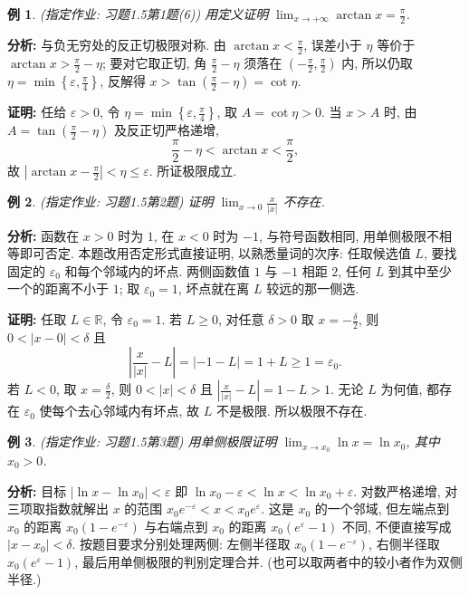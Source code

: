 \documentclass[UTF8,openany]{ctexbook}
\theoremstyle{chinesetextbook}
\newtheorem{example}{例}[section]
\newenvironment{cnproof}{\par\indent\textbf{证明:} \ignorespaces}{\par}
\begin{document}
\begin{example}
\textnormal{(指定作业: 习题1.5第1题(6))} 用定义证明 $\displaystyle \lim_{x\to+\infty}\arctan x=\frac\pi2$.
\end{example}
\par\indent\textbf{分析:} 与负无穷处的反正切极限对称. 由 $\displaystyle\arctan x<\frac\pi2$, 误差小于 $\eta$ 等价于 $\displaystyle\arctan x>\frac\pi2-\eta$; 要对它取正切, 角 $\displaystyle\frac\pi2-\eta$ 须落在 $\displaystyle\left(-\frac\pi2,\frac\pi2\right)$ 内, 所以仍取 $\displaystyle\eta=\min\left\{\varepsilon,\frac\pi4\right\}$, 反解得 $\displaystyle x>\tan\left(\frac\pi2-\eta\right)=\cot\eta$.
\begin{cnproof}
任给 $\varepsilon>0$, 令 $\displaystyle\eta=\min\left\{\varepsilon,\frac\pi4\right\}$, 取 $A=\cot\eta>0$. 当 $x>A$ 时, 由 $\displaystyle A=\tan\left(\frac\pi2-\eta\right)$ 及反正切严格递增,
\[
\frac\pi2-\eta<\arctan x<\frac\pi2,
\]
故 $\displaystyle\left|\arctan x-\frac\pi2\right|<\eta\le\varepsilon$. 所证极限成立.
\end{cnproof}
\begin{example}
\textnormal{(指定作业: 习题1.5第2题)} 证明 $\displaystyle \lim_{x\to0}\frac x{|x|}$ 不存在.
\end{example}
\par\indent\textbf{分析:} 函数在 $x>0$ 时为 $1$, 在 $x<0$ 时为 $-1$, 与符号函数相同, 用单侧极限不相等即可否定. 本题改用否定形式直接证明, 以熟悉量词的次序: 任取候选值 $L$, 要找固定的 $\varepsilon_0$ 和每个邻域内的坏点. 两侧函数值 $1$ 与 $-1$ 相距 $2$, 任何 $L$ 到其中至少一个的距离不小于 $1$; 取 $\varepsilon_0=1$, 坏点就在离 $L$ 较远的那一侧选.
\begin{cnproof}
任取 $L\in\mathbb R$, 令 $\varepsilon_0=1$. 若 $L\ge0$, 对任意 $\delta>0$ 取 $\displaystyle x=-\frac\delta2$, 则 $0<|x-0|<\delta$ 且
\[
\left|\frac x{|x|}-L\right|=|-1-L|=1+L\ge1=\varepsilon_0.
\]
若 $L<0$, 取 $\displaystyle x=\frac\delta2$, 则 $0<|x|<\delta$ 且 $\displaystyle\left|\frac x{|x|}-L\right|=1-L>1$. 无论 $L$ 为何值, 都存在 $\varepsilon_0$ 使每个去心邻域内有坏点, 故 $L$ 不是极限. 所以极限不存在.
\end{cnproof}
\begin{example}
\textnormal{(指定作业: 习题1.5第3题)} 用单侧极限证明 $\displaystyle \lim_{x\to x_0}\ln x=\ln x_0$, 其中 $x_0>0$.
\end{example}
\par\indent\textbf{分析:} 目标 $|\ln x-\ln x_0|<\varepsilon$ 即 $\ln x_0-\varepsilon<\ln x<\ln x_0+\varepsilon$. 对数严格递增, 对三项取指数就解出 $x$ 的范围 $x_0e^{-\varepsilon}<x<x_0e^{\varepsilon}$. 这是 $x_0$ 的一个邻域, 但左端点到 $x_0$ 的距离 $x_0(1-e^{-\varepsilon})$ 与右端点到 $x_0$ 的距离 $x_0(e^\varepsilon-1)$ 不同, 不便直接写成 $|x-x_0|<\delta$. 按题目要求分别处理两侧: 左侧半径取 $x_0(1-e^{-\varepsilon})$, 右侧半径取 $x_0(e^\varepsilon-1)$, 最后用单侧极限的判别定理合并. (也可以取两者中的较小者作为双侧半径.)
\end{document}
